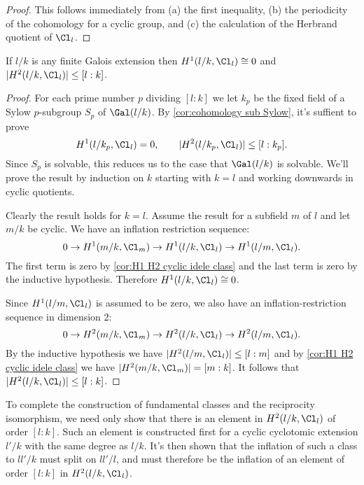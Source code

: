 \begin{proof}
	This follows immediately from (a) the first inequality, (b) the periodicity of
	the cohomology for a cyclic group, and (c) the calculation of the Herbrand quotient
	of $\Cl_{l}$.
\end{proof}

\begin{theorem} \label{thm:global cohomology bound}
	If $l/k$ is any finite Galois extension then $H^1(l/k, \Cl_{l}) \cong 0$
	and $|H^2(l/k, \Cl_{l})| \le [l:k]$.
\end{theorem}


\begin{proof}
	For each prime number $p$ dividing $[l:k]$ we let $k_p$ be the fixed
	field of a Sylow $p$-subgroup $S_p$ of $\Gal(l/k)$.
	By \ref{cor:cohomology sub Sylow}, it's suffient to prove
	\[
		H^1(l/k_p, \Cl_{l}) = 0, \qquad
		|H^2(l/k_p, \Cl_{l})| \le [l:k_p].
	\]
	Since $S_p$ is solvable, this reduces us to the case that $\Gal(l/k)$ is solvable.
	We'll prove the result by induction on $k$ starting with $k=l$ and working downwards
	in cyclic quotients.

	Clearly the result holds for $k=l$.
	Assume the result for a subfield $m$ of $l$ and let $m/k$ be cyclic.
	We have an inflation restriction sequence:
	\[
		0 \to H^1(m/k, \Cl_{m}) \to H^1(l/k, \Cl_{l}) \to H^1(l/m,\Cl_{l}).
	\]
	The first term is zero by \ref{cor:H1 H2 cyclic idele class} and the last term is zero by
	the inductive hypothesis.
	Therefore $H^1(l/k,\Cl_l) \cong 0$.

	Since $H^1(l/m,\Cl_l)$ is assumed to be zero, we also have an inflation-restriction sequence
	in dimension 2:
	\[
		0 \to H^2(m/k, \Cl_m) \to H^2(l/k, \Cl_l) \to H^2(l/m,\Cl_l).
	\]
	By the inductive hypothesis we have $|H^2(l/m,\Cl_l)| \le [l:m]$
	and by \ref{cor:H1 H2 cyclic idele class} we have $|H^2(m/k, \Cl_m)| = [m : k]$.
	It follows that $|H^2(l/k,\Cl_l)| \le [l : k]$.
\end{proof}


To complete the construction of fundamental classes and the reciprocity isomorphism,
we need only show that there is an element in $H^2(l/k,\Cl_l)$ of order $[l:k]$.
Such an element is constructed first for a cyclic cyclotomic extension $l'/k$ with the same degree
as $l/k$.
It's then shown that the inflation of such a class to $ll'/k$ must split on $ll'/l$,
and must therefore be the inflation of an element of order $[l:k]$ in $H^2(l/k,\Cl_l)$.
